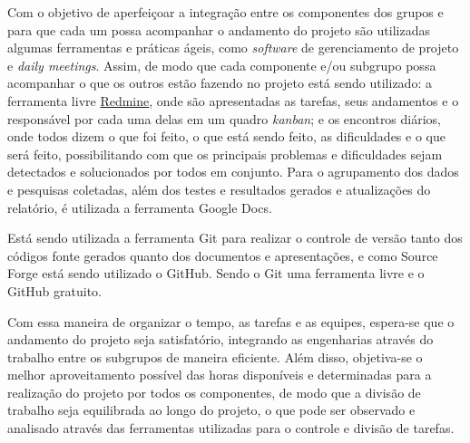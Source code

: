 Com o objetivo de aperfeiçoar a integração entre os componentes dos grupos e para que cada um possa acompanhar o andamento do projeto são utilizadas algumas 
ferramentas e práticas ágeis, como \textit{software} de gerenciamento de projeto e \textit{daily meetings}. Assim, de modo que cada componente e/ou subgrupo 
possa acompanhar o que os outros estão fazendo no projeto está sendo utilizado: a ferramenta livre \href{http://lappis.unb.br/redm}{Redmine}, onde são apresentadas as tarefas, seus andamentos e o 
responsável por cada uma delas em um quadro \textit{kanban}; e os encontros diários, onde todos dizem o que foi feito, o que está sendo feito, as dificuldades
e o que será feito, possibilitando com que os principais problemas e dificuldades sejam detectados e solucionados por todos em conjunto. Para o agrupamento 
dos dados e pesquisas coletadas, além dos testes e resultados gerados e atualizações do relatório, é utilizada a ferramenta Google Docs.

Está sendo utilizada a ferramenta Git para realizar o controle de versão tanto dos códigos fonte gerados quanto dos documentos e apresentações, e como Source
Forge está sendo utilizado o GitHub. Sendo o Git uma ferramenta livre e o GitHub gratuito.

Com essa maneira de organizar o tempo, as tarefas e as equipes, espera-se que o andamento do projeto seja satisfatório, integrando as engenharias através do 
trabalho entre os subgrupos de maneira eficiente. Além disso, objetiva-se o melhor aproveitamento possível das horas disponíveis e determinadas para a realização 
do projeto por todos os componentes, de modo que a divisão de trabalho seja equilibrada ao longo do projeto, o que pode ser observado e analisado através das 
ferramentas utilizadas para o controle e divisão de tarefas.

